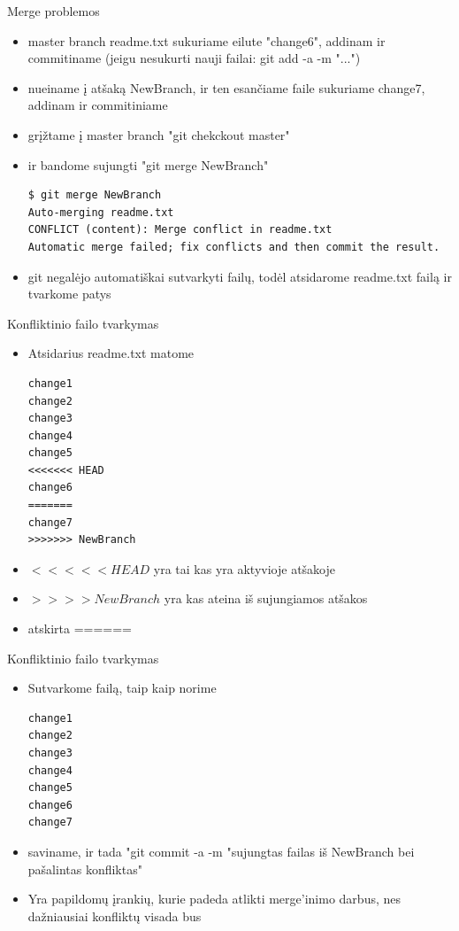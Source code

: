 \documentclass[11pt,xcolor=table]{beamer}
\begin{document}
\begin{frame}[fragile]{Merge problemos}
\begin{itemize}
\item master branch readme.txt sukuriame eilute "change6", addinam ir commitiname (jeigu nesukurti nauji failai: git add -a -m "...")
\item nueiname į atšaką NewBranch, ir ten esančiame faile sukuriame change7, addinam ir commitiniame
\item grįžtame į master branch "git chekckout master"
\item ir bandome sujungti "git merge NewBranch"

\begin{lstlisting}
$ git merge NewBranch
Auto-merging readme.txt
CONFLICT (content): Merge conflict in readme.txt
Automatic merge failed; fix conflicts and then commit the result.
\end{lstlisting}
\item git negalėjo automatiškai sutvarkyti failų, todėl atsidarome readme.txt failą ir tvarkome patys
\end{itemize}
\end{frame}

\begin{frame}[fragile]{Konfliktinio failo tvarkymas}
\begin{itemize}
\item Atsidarius readme.txt matome

\begin{lstlisting}
change1
change2
change3
change4
change5
<<<<<<< HEAD
change6
=======
change7
>>>>>>> NewBranch
\end{lstlisting}
\item $<<<<<HEAD$ yra tai kas yra aktyvioje atšakoje
\item $>>>>NewBranch$ yra kas ateina iš sujungiamos atšakos
\item atskirta ======
\end{itemize}
\end{frame}


\begin{frame}[fragile]{Konfliktinio failo tvarkymas}
\begin{itemize}
\item Sutvarkome failą, taip kaip norime
\begin{lstlisting}
change1
change2
change3
change4
change5
change6
change7
\end{lstlisting}
\item saviname, ir tada "git commit -a -m "sujungtas failas iš NewBranch bei pašalintas konfliktas"
\item Yra papildomų įrankių, kurie padeda atlikti merge'inimo darbus, nes dažniausiai konfliktų visada bus
\end{itemize}
\end{frame}
\end{document}

